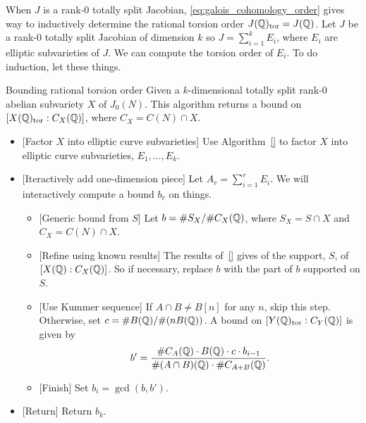 When $J$ is a rank-0 totally split Jacobian, \eqref{eq:galois_cohomology_order}
gives way to inductively determine the rational torsion order
$J(\mathbb{Q})_{\mathrm{tor}}=J(\mathbb{Q})$. Let $J$ be a rank-0 totally split Jacobian of dimension
$k$ so $J = \sum_{i=1} ^k E_i$, where $E_i$ are elliptic subvarieties of $J$.
We can compute the torsion order of $E_i$. To do induction, let these things.

\begin{algorithm}{Bounding rational torsion order}%
    \label{alg:bound_rational_torsion_order}
    Given a $k$-dimensional totally split rank-0 abelian subvariety $X$ of
    $J_0(N)$. This algorithm returns a bound on $[X(\mathbb{Q})_{\mathrm{tor}}:C_X(\mathbb{Q})]$, where
    $C_X=C(N)\cap X$.
    \begin{itemize}
        \item{} [Factor $X$ into elliptic curve subvarieties] 
            Use Algorithm~\ref{} to factor $X$ into elliptic curve
            subvarieties, $E_1,\ldots,E_k$.
        \item{} [Iteractively add one-dimension piece]
            Let $A_r = \sum_{i=1} ^r E_i$. We will interactively compute a
            bound $b_r$ on things. %
            \begin{itemize}
                \item{} [Generic bound from $S$]
                    Let $b=\# S_X/\#C_X(\mathbb{Q})$, where $S_X=S\cap X$ and
                    $C_X=C(N)\cap X$.
                \item{} [Refine using known results]
                    The results of~\ref{} gives of the support, $S$, of
                    $[X(\mathbb{Q}):C_X(\mathbb{Q})]$. So if
                    necessary, replace $b$ with the part of $b$ supported on
                    $S$.
                \item{} [Use Kummer sequence]
                    If $A\cap B\neq B[n]$ for any $n$, skip this step.
                    Otherwise, set $c=\# B(\mathbb{Q}) / \#(nB(\mathbb{Q}))$.
                    A bound on $[Y(\mathbb{Q})_{\mathrm{tor}}:C_Y(\mathbb{Q})]$ is given by
                    \[
                        b' =
                        \frac{\#C_A(\mathbb{Q})\cdot B(\mathbb{Q})\cdot c\cdot
                        b_{i-1}}{\#(A\cap B)(\mathbb{Q})\cdot\# C_{A+B}(\mathbb{Q})}.
                    \]
                \item{} [Finish]
                    Set $b_i=\gcd(b,b')$.
            \end{itemize}
        \item{} [Return]
            Return $b_k$.
    \end{itemize}
\end{algorithm}


